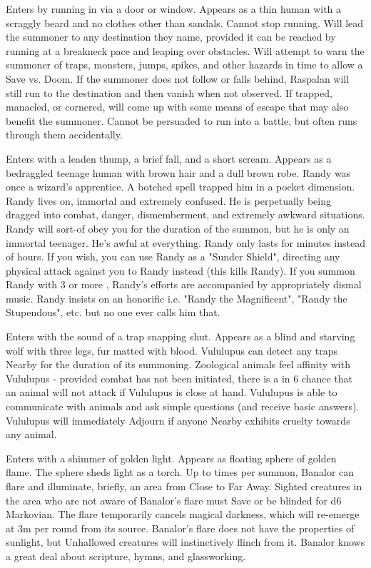 {
Enters by running in via a door or window. Appears as a thin human with a scraggly beard and no clothes other than sandals. Cannot stop running. Will lead the summoner to any destination they name, provided it can be reached by running at a breakneck pace and leaping over obstacles. Will attempt to warn the summoner of traps, monsters, jumps, spikes, and other hazards in time to allow a Save vs. Doom. If the summoner does not follow or falls behind, Raspalan will still run to the destination and then vanish when not observed. If trapped, manacled, or cornered, will come up with some means of escape that may also benefit the summoner. Cannot be persuaded to run into a battle, but often runs through them accidentally.




Enters with a leaden thump, a brief fall, and a short scream. Appears as a bedraggled teenage human with brown hair and a dull brown robe. Randy was once a wizard's apprentice. A botched spell trapped him in a pocket dimension. Randy lives on, immortal and extremely confused. He is perpetually being dragged into combat, danger, dismemberment, and extremely awkward situations. Randy will sort-of obey you for the duration of the summon, but he is only an immortal teenager. He's awful at everything. Randy only lasts for \SUMDICE minutes instead of \SUMDICE hours.  If you wish, you can use Randy as a "Sunder Shield", directing any physical attack against you to Randy instead (this kills Randy).  If you summon Randy with 3 or more \DICE, Randy's efforts are accompanied by appropriately dismal music.  Randy insists on an honorific i.e. "Randy the Magnificent", "Randy the Stupendous", etc. but no one ever calls him that.


Enters with the sound of a trap snapping shut. Appears as a blind and starving wolf with three legs, fur matted with blood.  Vululupus can detect any traps Nearby for the duration of its summoning.  Zoological animals feel affinity with Vululupus - provided combat has not been initiated, there is a \DICE in 6 chance that an animal will not attack if Vululupus is close at hand.  Vululupus is able to communicate with animals and ask simple questions (and receive basic answers).  Vululupus will immediately Adjourn if anyone Nearby exhibits cruelty towards any animal.

Enters with a shimmer of golden light. Appears as floating sphere of golden flame. The sphere sheds light as a torch. Up to \DICE times per summon, Banalor can flare and illuminate, briefly, an area from Close to Far Away. Sighted creatures in the area who are not aware of Banalor's flare must Save or be blinded for d6 Markovian. The flare temporarily cancels magical darkness, which will re-emerge at 3m per round from its source. Banalor's flare does not have the properties of sunlight, but Unhallowed creatures will instinctively flinch from it. Banalor knows a great deal about scripture, hymns, and glassworking.


}
